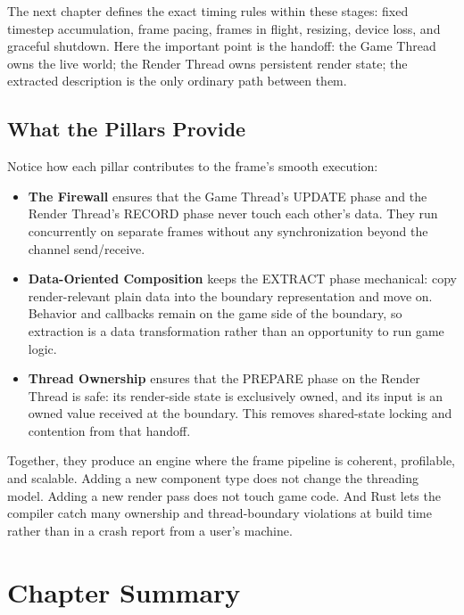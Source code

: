 \documentclass[
  11pt,
  letterpaper,
  DIV=11,
  numbers=noendperiod,
  twoside,
  open=right]{scrreprt}
\begin{document}
The next chapter defines the exact timing rules within these stages:
fixed timestep accumulation, frame pacing, frames in flight, resizing,
device loss, and graceful shutdown. Here the important point is the
handoff: the Game Thread owns the live world; the Render Thread owns
persistent render state; the extracted description is the only ordinary
path between them.

\subsection{What the Pillars Provide}\label{what-the-pillars-provide}

Notice how each pillar contributes to the frame's smooth execution:

\begin{itemize}
\item
  \textbf{The Firewall} ensures that the Game Thread's UPDATE phase and
  the Render Thread's RECORD phase never touch each other's data. They
  run concurrently on separate frames without any synchronization beyond
  the channel send/receive.
\item
  \textbf{Data-Oriented Composition} keeps the EXTRACT phase mechanical:
  copy render-relevant plain data into the boundary representation and
  move on. Behavior and callbacks remain on the game side of the
  boundary, so extraction is a data transformation rather than an
  opportunity to run game logic.
\item
  \textbf{Thread Ownership} ensures that the PREPARE phase on the Render
  Thread is safe: its render-side state is exclusively owned, and its
  input is an owned value received at the boundary. This removes
  shared-state locking and contention from that handoff.
\end{itemize}

Together, they produce an engine where the frame pipeline is coherent,
profilable, and scalable. Adding a new component type does not change
the threading model. Adding a new render pass does not touch game code.
And Rust lets the compiler catch many ownership and thread-boundary
violations at build time rather than in a crash report from a user's
machine.

\section*{Chapter Summary}\label{chapter-summary-2}

\end{document}
